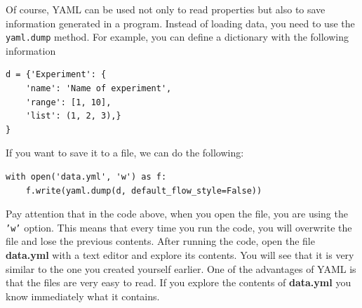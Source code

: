 

Of course, YAML can be used not only to read properties but also to save information generated in a program. Instead of loading data, you need to use the \texttt{yaml.dump} method. For example, you can define a dictionary with the following information

\begin{verbatim}
d = {'Experiment': {
    'name': 'Name of experiment',
    'range': [1, 10],
    'list': (1, 2, 3),}
}
\end{verbatim}

If you want to save it to a file, we can do the following:

\begin{verbatim}
with open('data.yml', 'w') as f:
    f.write(yaml.dump(d, default_flow_style=False))
\end{verbatim}

Pay attention that in the code above, when you open the file, you are using the \texttt{'w'} option. This means that every time you run the code, you will overwrite the file and lose the previous contents. After running the code, open the file \textbf{data.yml} with a text editor and explore its contents. You will see that it is very similar to the one you created yourself earlier. One of the advantages of YAML is that the files are very easy to read. If you explore the contents of \textbf{data.yml} you know immediately what it contains.





